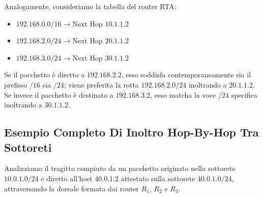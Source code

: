 \documentclass[11pt, a4paper]{article}
\begin{document}
Analogamente, consideriamo la tabella del router RTA:
\begin{itemize}[noitemsep]
    \item $192.168.0.0/16 \to \text{Next Hop } 10.1.1.2$
    \item $192.168.2.0/24 \to \text{Next Hop } 20.1.1.2$
    \item $192.168.3.0/24 \to \text{Next Hop } 30.1.1.2$
\end{itemize}
Se il pacchetto è diretto a $192.168.2.2$, esso soddisfa contemporaneamente sia il prefisso $/16$ sia $/24$; viene preferita la rotta $192.168.2.0/24$ inoltrando a $20.1.1.2$. Se invece il pacchetto è destinato a $192.168.3.2$, esso matcha la voce $/24$ specifica inoltrando a $30.1.1.2$.

\subsection{Esempio Completo Di Inoltro Hop-By-Hop Tra Sottoreti}

Analizziamo il tragitto compiuto da un pacchetto originato nella sottorete $10.0.1.0/24$ e diretto all'host $40.0.1.2$ attestato sulla sottorete $40.0.1.0/24$, attraversando la dorsale formata dai router $R_1$, $R_2$ e $R_3$.

\end{document}
